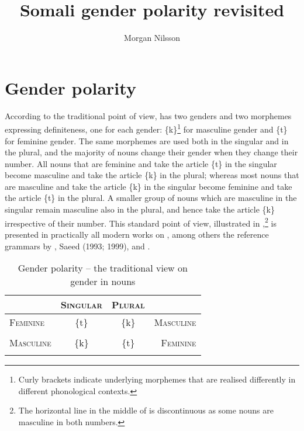 \documentclass[output=paper]{langsci/langscibook}
\title{Somali gender polarity revisited}
\author{%
 Morgan Nilsson \affiliation{University of Gothenburg} 
}
\begin{document}
 
 

\section{Gender polarity}
 
According to the traditional point of view,  has two genders and two morphemes expressing definiteness, one for each gender: \{k\}\footnote{Curly brackets indicate underlying morphemes that are realised differently in different phonological contexts.} for masculine gender and \{t\} for feminine gender. The same morphemes are used both in the singular and in the plural, and the majority of  nouns change their gender when they change their number. All nouns that are feminine and take the article \{t\} in the singular become masculine and take the article \{k\} in the plural; whereas most nouns that are masculine and take the article \{k\} in the singular become feminine and take the article \{t\} in the plural. A smaller group of nouns which are masculine in the singular remain masculine also in the plural, and hence take the article \{k\} irrespective of their number. This standard point of view, illustrated in ,\footnote{The horizontal line in the middle of  is discontinuous as some nouns are masculine in both numbers.
} is presented in practically all modern works on , among others the reference grammars by \citet{Moreno1955}, Saeed (1993; 1999), \citet{PuglielliMansuur1999} and \citet{Berchem2012}.
 
\begin{table}
\caption{Gender polarity – the traditional view on gender in  nouns}
\label{tab:nilsson:1}

\begin{tabular}{lccr} 
\lsptoprule
& \textsc{Singular}& \textsc{Plural}& \\
\midrule
\textsc{Feminine}& \{t\}& \{k\}& \textsc{Masculine}\\
\hhline{--~~} &  &  & \\[-.8em]
\hhline{~~--}
\textsc{Masculine}& \{k\}& \{t\}& \textsc{Feminine}\\
\lspbottomrule
\end{tabular}

\end{table} 
\end{document}
